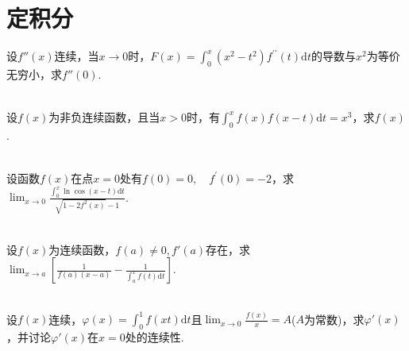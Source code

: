 \section{定积分}
\begin{xiti}
	\item 设$f''(x)$连续，当$x\rightarrow 0$时，$F ( x ) = \int _ { 0 } ^ { x } \left( x ^ { 2 } - t ^ { 2 } \right) f ^ { \prime \prime } ( t ) \mathrm { d } t$的导数与$x^{2}$为等价无穷小，求$f''(0)$.
		\begin{solution}
		\begin{align*}
		\end{align*}
	\end{solution}



	\item 设$f(x)$为非负连续函数，且当$x>0$时，有$\int _ { 0 } ^ { x } f ( x ) f ( x - t ) \mathrm { d } t = x ^ { 3 }$，求$f(x)$.
		\begin{solution}
		\begin{align*}
		\end{align*}
	\end{solution}

	
	\item 设函数$f(x)$在点$x=0$处有$f ( 0 ) = 0 , \quad f ^ { \prime } ( 0 ) = - 2$，求$\lim _ { x \rightarrow 0 } \frac { \int _ { 0 } ^ { x } \ln \cos ( x - t ) \mathrm { d } t } { \sqrt { 1 - 2 f ^ { 2 } ( x ) } - 1 }$.
		\begin{solution}
		\begin{align*}
		\end{align*}
	\end{solution}

	
	\item 设$f(x)$为连续函数，$f(a)\ne 0,f'(a)$存在，求$\lim _ { x \rightarrow a } \left[ \frac { 1 } { f ( a ) ( x - a ) } - \frac { 1 } { \int _ { a } ^ { x } f ( t ) \mathrm { d } t } \right]$.
		\begin{solution}
		\begin{align*}
		\end{align*}
	\end{solution}

	
	\item 设$f(x)$连续，$\varphi ( x ) = \int _ { 0 } ^ { 1 } f ( x t ) \mathrm { d } t$且$\lim _ { x \rightarrow 0 } \frac { f ( x ) } { x } = A$($A$为常数)，求$\varphi'(x)$，并讨论$\varphi'(x)$在$x=0$处的连续性.
		\begin{solution}
		\begin{align*}
		\end{align*}
	\end{solution}


\end{xiti}
